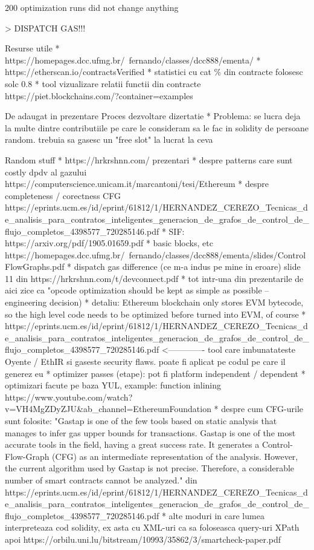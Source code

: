200 optimization runs did not change anything

> DISPATCH GAS!!!



Resurse utile
* https://homepages.dcc.ufmg.br/~fernando/classes/dcc888/ementa/
* https://etherscan.io/contractsVerified
  * statistici cu cat \% din contracte folosesc solc 0.8
* tool vizualizare relatii functii din contracte https://piet.blockchains.com/?container=examples%

De adaugat in prezentare
Proces dezvoltare dizertatie
* Problema: se lucra deja la multe dintre contributiile pe care le consideram sa le fac in solidity de persoane random. trebuia sa gasesc un "free slot" la lucrat la ceva

Random stuff
  * https://hrkrshnn.com/ prezentari
  * despre patterns care sunt costly dpdv al gazului https://computerscience.unicam.it/marcantoni/tesi/Ethereum%
  * despre completeness / corectness CFG https://eprints.ucm.es/id/eprint/61812/1/HERNANDEZ_CEREZO_Tecnicas_de_analisis_para_contratos_inteligentes_generacion_de_grafos_de_control_de_flujo_completos_4398577_720285146.pdf
  * SIF: https://arxiv.org/pdf/1905.01659.pdf
  * basic blocks, etc https://homepages.dcc.ufmg.br/~fernando/classes/dcc888/ementa/slides/ControlFlowGraphs.pdf
  * dispatch gas difference (ce m-a indus pe mine in eroare) slide 11 din https://hrkrshnn.com/t/devconnect.pdf
    * tot intr-una din prezentarile de aici zice ca "opcode optimization should be kept as simple as possible – engineering decision)
  * detaliu: Ethereum blockchain only stores EVM bytecode, so the high level code needs to be optimized before turned into EVM, of course
  * https://eprints.ucm.es/id/eprint/61812/1/HERNANDEZ_CEREZO_Tecnicas_de_analisis_para_contratos_inteligentes_generacion_de_grafos_de_control_de_flujo_completos_4398577_720285146.pdf     <------------- tool care imbunatateste Oyente / EthIR si gaseste security flaws. poate fi aplicat pe codul pe care il generez eu
  * optimizer passes (etape): pot fi platform independent / dependent
  * optimizari facute pe baza YUL, example: function inlining https://www.youtube.com/watch?v=VH4MgZDyZJU&ab_channel=EthereumFoundation
  * despre cum CFG-urile sunt folosite: "Gastap is one of the few tools based on static analysis that manages to infer gas upper
  bounds for transactions. Gastap is one of the most accurate tools in the field, having a
  great success rate. It generates a Control-Flow-Graph (CFG) as an intermediate representation of the analysis. However, the current algorithm used by Gastap is not precise.
  Therefore, a considerable number of smart contracts cannot be analyzed." din https://eprints.ucm.es/id/eprint/61812/1/HERNANDEZ_CEREZO_Tecnicas_de_analisis_para_contratos_inteligentes_generacion_de_grafos_de_control_de_flujo_completos_4398577_720285146.pdf
  * alte moduri in care lumea interpreteaza cod solidity, ex asta cu XML-uri ca sa foloseasca query-uri XPath apoi https://orbilu.uni.lu/bitstream/10993/35862/3/smartcheck-paper.pdf



